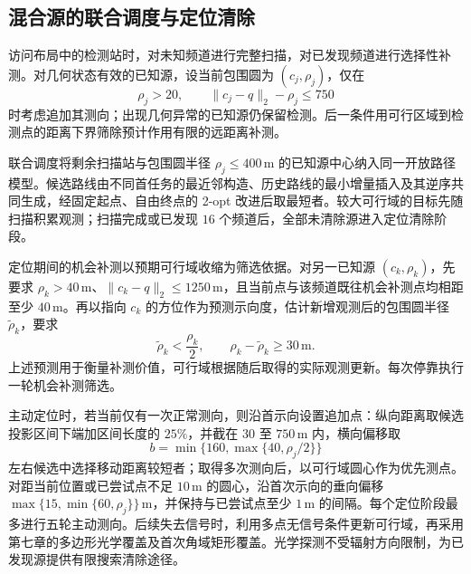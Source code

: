 \documentclass[withoutpreface,bwprint]{cumcmthesis} %
\begin{document}
\subsection{混合源的联合调度与定位清除}
访问布局中的检测站时，对未知频道进行完整扫描，对已发现频道进行选择性补测。对几何状态有效的已知源，设当前包围圆为 $(c_j,\rho_j)$，仅在
\begin{equation}
 \rho_j>20,\qquad\|c_j-q\|_2-\rho_j\leq750
\end{equation}
时考虑追加其测向；出现几何异常的已知源仍保留检测。后一条件用可行区域到检测点的距离下界筛除预计作用有限的远距离补测。

联合调度将剩余扫描站与包围圆半径 $\rho_j\leq400\,\mathrm m$ 的已知源中心纳入同一开放路径模型。候选路线由不同首任务的最近邻构造、历史路线的最小增量插入及其逆序共同生成，经固定起点、自由终点的 2-opt 改进后取最短者。较大可行域的目标先随扫描积累观测；扫描完成或已发现 $16$ 个频道后，全部未清除源进入定位清除阶段。

定位期间的机会补测以预期可行域收缩为筛选依据。对另一已知源 $(c_k,\rho_k)$，先要求 $\rho_k>40\,\mathrm m$、$\|c_k-q\|_2\leq1250\,\mathrm m$，且当前点与该频道既往机会补测点均相距至少 $40\,\mathrm m$。再以指向 $c_k$ 的方位作为预测示向度，估计新增观测后的包围圆半径 $\widetilde\rho_k$，要求
\begin{equation}
 \widetilde\rho_k<\frac{\rho_k}{2},\qquad
 \rho_k-\widetilde\rho_k\geq30\,\mathrm m.
 \label{eq:b26-q4-opportunity}
\end{equation}
上述预测用于衡量补测价值，可行域根据随后取得的实际观测更新。每次停靠执行一轮机会补测筛选。

主动定位时，若当前仅有一次正常测向，则沿首示向设置追加点：纵向距离取候选投影区间下端加区间长度的 $25\%$，并截在 $30$ 至 $750\,\mathrm m$ 内，横向偏移取
\begin{equation}
 b=\min\{160,\max\{40,\rho_j/2\}\}
\end{equation}
左右候选中选择移动距离较短者；取得多次测向后，以可行域圆心作为优先测点。对距当前位置或已尝试点不足 $10\,\mathrm m$ 的圆心，沿首次示向的垂向偏移 $\max\{15,\min\{60,\rho_j\}\}\,\mathrm m$，并保持与已尝试点至少 $1\,\mathrm m$ 的间隔。每个定位阶段最多进行五轮主动测向。后续失去信号时，利用多点无信号条件更新可行域，再采用第七章的多边形光学覆盖及首次角域矩形覆盖。光学探测不受辐射方向限制，为已发现源提供有限搜索清除途径。
\end{document}
